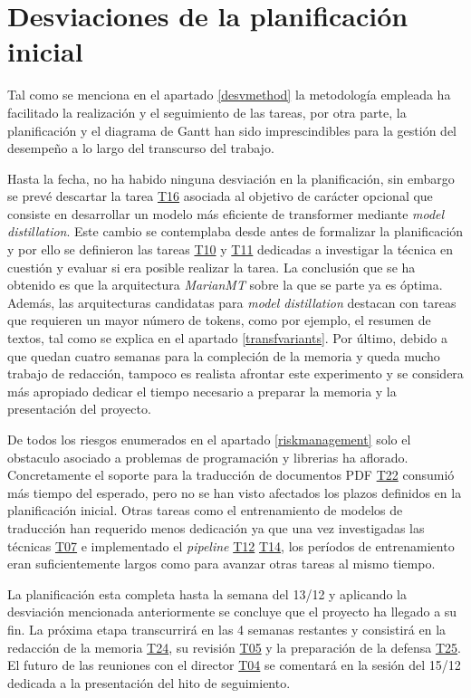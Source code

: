\section{Desviaciones de la planificación inicial}\label{desviaplan}
Tal como se menciona en el apartado \ref{desvmethod} la metodología empleada ha facilitado la realización y el seguimiento de las tareas, por otra parte, la planificación y el diagrama de Gantt han sido imprescindibles para la gestión del desempeño a lo largo del transcurso del trabajo.

Hasta la fecha, no ha habido ninguna desviación en la planificación, sin embargo se prevé descartar la tarea \hyperref[T16]{T16} asociada al objetivo de carácter opcional que consiste en desarrollar un modelo más eficiente de transformer mediante \textit{model distillation}. Este cambio se contemplaba desde antes de formalizar la planificación y por ello se definieron las tareas \hyperref[T10]{T10} y \hyperref[T11]{T11} dedicadas a investigar la técnica en cuestión y evaluar si era posible realizar la tarea.
La conclusión que se ha obtenido es que la arquitectura \textit{MarianMT} sobre la que se parte ya es óptima. Además, las arquitecturas candidatas para \textit{model distillation} destacan con tareas que requieren un mayor número de tokens, como por ejemplo, el resumen de textos, tal como se explica en el apartado \ref{transfvariants}. Por último, debido a que quedan cuatro semanas para la compleción de la memoria y queda mucho trabajo de redacción, tampoco es realista afrontar este experimento y se considera más apropiado dedicar el tiempo necesario a preparar la memoria y la presentación del proyecto.

De todos los riesgos enumerados en el apartado \ref{riskmanagement} solo el obstaculo asociado a problemas de programación y librerias ha aflorado.
Concretamente el soporte para la traducción de documentos PDF \hyperref[T22]{T22} consumió más tiempo del esperado, pero no se han visto afectados los plazos definidos en la planificación inicial. Otras tareas como el entrenamiento de modelos de traducción han requerido menos dedicación ya que una vez investigadas las técnicas \hyperref[T07]{T07} e implementado el \textit{pipeline} \hyperref[T12]{T12} \hyperref[T14]{T14}, los períodos de entrenamiento eran suficientemente largos como para avanzar otras tareas al mismo tiempo.

La planificación esta completa hasta la semana del 13/12 y aplicando la desviación mencionada anteriormente se concluye que el proyecto ha llegado a su fin. La próxima etapa transcurrirá en las 4 semanas restantes y consistirá en la redacción de la memoria \hyperref[T24]{T24}, su revisión \hyperref[T05]{T05} y la preparación de la defensa \hyperref[T25]{T25}. El futuro de las reuniones con el director \hyperref[T04]{T04} se comentará en la sesión del 15/12 dedicada a la presentación del hito de seguimiento.